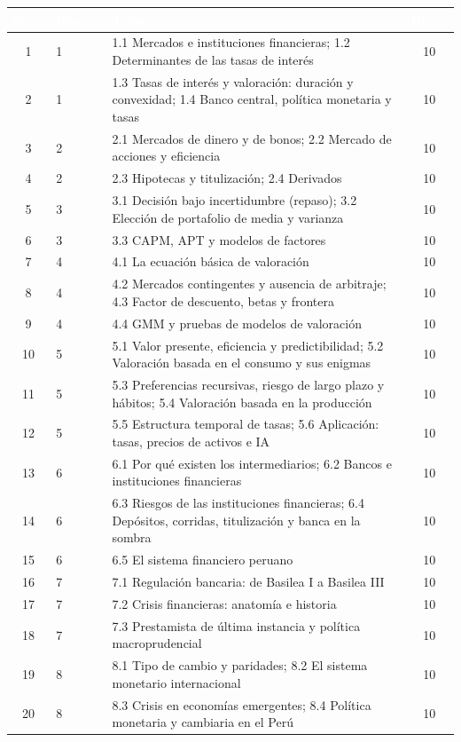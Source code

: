 \documentclass[11pt,a4paper]{article}
\newcommand{\cab}[1]{\textcolor{white}{\sffamily\bfseries #1}}
\newcommand{\filasalternas}{\rowcolors{2}{white}{mhpale}}
\begin{document}
{\small\filasalternas
\noindent\begin{tabularx}{\textwidth}{clXc}
\toprule
\rowcolor{mhnavy}\cab{Sem.} & \cab{Bloque} & \cab{Temas} & \cab{Horas} \\
\midrule
1  & 1 & 1.1 Mercados e instituciones financieras; 1.2 Determinantes de las tasas de interés & 10 \\
2  & 1 & 1.3 Tasas de interés y valoración: duración y convexidad; 1.4 Banco central, política monetaria y tasas & 10 \\
\midrule
3  & 2 & 2.1 Mercados de dinero y de bonos; 2.2 Mercado de acciones y eficiencia & 10 \\
4  & 2 & 2.3 Hipotecas y titulización; 2.4 Derivados & 10 \\
\midrule
5  & 3 & 3.1 Decisión bajo incertidumbre (repaso); 3.2 Elección de portafolio de media y varianza & 10 \\
6  & 3 & 3.3 CAPM, APT y modelos de factores & 10 \\
\midrule
7  & 4 & 4.1 La ecuación básica de valoración & 10 \\
8  & 4 & 4.2 Mercados contingentes y ausencia de arbitraje; 4.3 Factor de descuento, betas y frontera & 10 \\
9  & 4 & 4.4 GMM y pruebas de modelos de valoración & 10 \\
\midrule
10 & 5 & 5.1 Valor presente, eficiencia y predictibilidad; 5.2 Valoración basada en el consumo y sus enigmas & 10 \\
11 & 5 & 5.3 Preferencias recursivas, riesgo de largo plazo y hábitos; 5.4 Valoración basada en la producción & 10 \\
12 & 5 & 5.5 Estructura temporal de tasas; 5.6 Aplicación: tasas, precios de activos e IA & 10 \\
\midrule
13 & 6 & 6.1 Por qué existen los intermediarios; 6.2 Bancos e instituciones financieras & 10 \\
14 & 6 & 6.3 Riesgos de las instituciones financieras; 6.4 Depósitos, corridas, titulización y banca en la sombra & 10 \\
15 & 6 & 6.5 El sistema financiero peruano & 10 \\
\midrule
16 & 7 & 7.1 Regulación bancaria: de Basilea I a Basilea III & 10 \\
17 & 7 & 7.2 Crisis financieras: anatomía e historia & 10 \\
18 & 7 & 7.3 Prestamista de última instancia y política macroprudencial & 10 \\
\midrule
19 & 8 & 8.1 Tipo de cambio y paridades; 8.2 El sistema monetario internacional & 10 \\
20 & 8 & 8.3 Crisis en economías emergentes; 8.4 Política monetaria y cambiaria en el Perú & 10 \\
\bottomrule
\end{tabularx}
}
\end{document}
